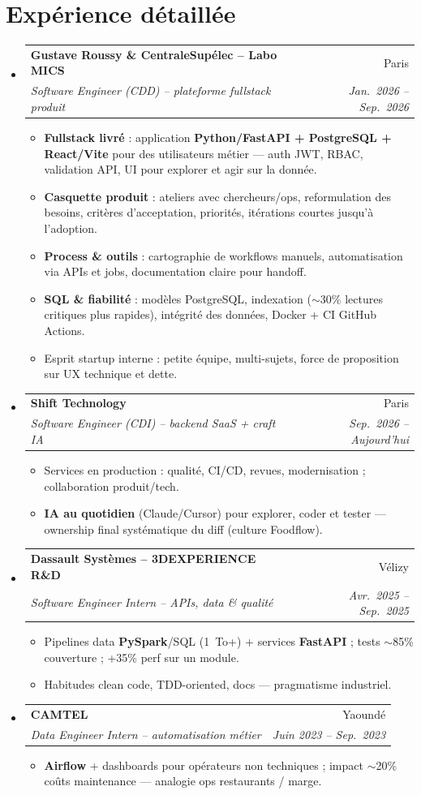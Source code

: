\documentclass[a4paper,10.5pt]{article}
\makeatletter
\newcommand{\resumeItem}[1]{\item\small{#1}}
\newcommand{\resumeSubheading}[4]{\vspace{3pt}\item\begin{tabular*}{0.97\textwidth}[t]{l@{\extracolsep{\fill}}r}\textbf{#1}&{#2}\\\textit{\small #3}&\textit{\small #4}\\\end{tabular*}\vspace{1pt}}
\newcommand{\resumeSubHeadingListStart}{\begin{itemize}[leftmargin=0.08in,label={}]}
\newcommand{\resumeSubHeadingListEnd}{\end{itemize}}
\makeatother
\begin{document}
\section{Exp\'erience d\'etaill\'ee}
\resumeSubHeadingListStart
  \resumeSubheading
    {Gustave Roussy \& CentraleSup\'elec -- Labo MICS}{Paris}
    {Software Engineer (CDD) -- plateforme fullstack produit}{Jan.~2026 -- Sep.~2026}
    \begin{itemize}
      \resumeItem{\textbf{Fullstack livr\'e} : application \textbf{Python/FastAPI + PostgreSQL + React/Vite} pour des utilisateurs m\'etier --- auth JWT, RBAC, validation API, UI pour explorer et agir sur la donn\'ee.}
      \resumeItem{\textbf{Casquette produit} : ateliers avec chercheurs/ops, reformulation des besoins, crit\`eres d'acceptation, priorit\'es, it\'erations courtes jusqu'\`a l'adoption.}
      \resumeItem{\textbf{Process \& outils} : cartographie de workflows manuels, automatisation via APIs et jobs, documentation claire pour handoff.}
      \resumeItem{\textbf{SQL \& fiabilit\'e} : mod\`eles PostgreSQL, indexation ($\sim$30\% lectures critiques plus rapides), int\'egrit\'e des donn\'ees, Docker + CI GitHub Actions.}
      \resumeItem{Esprit startup interne : petite \'equipe, multi-sujets, force de proposition sur UX technique et dette.}
    \end{itemize}
  \resumeSubheading
    {Shift Technology}{Paris}
    {Software Engineer (CDI) -- backend SaaS + craft IA}{Sep.~2026 -- Aujourd'hui}
    \begin{itemize}
      \resumeItem{Services en production : qualit\'e, CI/CD, revues, modernisation ; collaboration produit/tech.}
      \resumeItem{\textbf{IA au quotidien} (Claude/Cursor) pour explorer, coder et tester --- ownership final syst\'ematique du diff (culture Foodflow).}
    \end{itemize}
  \resumeSubheading
    {Dassault Syst\`emes -- 3DEXPERIENCE R\&D}{V\'elizy}
    {Software Engineer Intern -- APIs, data \& qualit\'e}{Avr.~2025 -- Sep.~2025}
    \begin{itemize}
      \resumeItem{Pipelines data \textbf{PySpark}/SQL (1~To+) + services \textbf{FastAPI} ; tests $\sim$85\% couverture ; +35\% perf sur un module.}
      \resumeItem{Habitudes clean code, TDD-oriented, docs --- pragmatisme industriel.}
    \end{itemize}
  \resumeSubheading
    {CAMTEL}{Yaound\'e}
    {Data Engineer Intern -- automatisation m\'etier}{Juin 2023 -- Sep.~2023}
    \begin{itemize}
      \resumeItem{\textbf{Airflow} + dashboards pour op\'erateurs non techniques ; impact $\sim$20\% co\^uts maintenance --- analogie ops restaurants / marge.}
    \end{itemize}
\resumeSubHeadingListEnd
\end{document}
